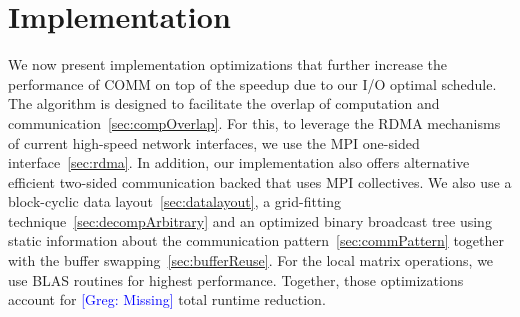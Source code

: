 \documentclass[sigplan,review,anonymous,10pt]{acmart}\settopmatter{printfolios=true,printccs=false,printacmref=false}
\newcommand\greg[1]{\textcolor{blue}{[Greg: #1]}}
\begin{document}

\section{Implementation}
\label{sec:implementation}
We now present implementation optimizations that further 
increase the performance of COMM on top of the speedup due to our I/O optimal 
schedule. The algorithm is designed to facilitate the overlap of computation 
and communication~\cref{sec:compOverlap}. For this, to leverage the RDMA 
mechanisms of 
current high-speed network interfaces, we use the MPI one-sided 
interface~\cref{sec:rdma}. In addition, our implementation also offers 
alternative efficient two-sided communication backed that uses MPI collectives. 
We also use a block-cyclic data 
layout~\cref{sec:datalayout}, a grid-fitting 
technique~\cref{sec:decompArbitrary} and an optimized binary broadcast 
tree using static information about
the communication pattern~\cref{sec:commPattern} together with the buffer 
swapping~\cref{sec:bufferReuse}. For the local matrix operations, we use 
BLAS routines for highest performance. Together, those optimizations account 
for \greg{Missing} total runtime 
reduction. 
\end{document}
